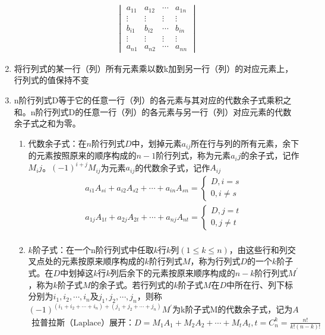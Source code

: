 \documentclass[12pt]{book}
\begin{document}
\begin{enumerate}[1.]
\begin{gather*}
\begin{vmatrix}
                  a_{11} & a_{12} & \cdots & a_{1n} \\
                  \vdots & \vdots & \vdots & \vdots \\
                  b_{i1} & b_{i2} & \cdots & b_{in} \\
                  \vdots & \vdots & \vdots & \vdots \\
                  a_{n1} & a_{n2} & \cdots & a_{nn}
              \end{vmatrix}
          \end{gather*}
    \item 将行列式的某一行（列）所有元素乘以数k加到另一行（列）的对应元素上，行列式的值保持不变
    \item n阶行列式D等于它的任意一行（列）的各元素与其对应的代数余子式乘积之和。n阶行列式D的任意一行（列）的各元素与另一行（列）对应元素的代数余子式之和为零。
    \begin{enumerate}[(1)]
        \item 代数余子式：在$n$阶行列式$D$中，划掉元素$a_{ij}$所在行与列的所有元素，余下的元素按照原来的顺序构成的$n-1$阶行列式，称为元素$a_ij$的余子式，记作$M_ij$。$(-1)^{i+j}M_{ij}$为元素$a_{ij}$的代数余子式，记作$A_{ij}$
        \begin{gather*}
            a_{i1}A_{si}+a_{i2}A_{s2}+\cdots+a_{in}A_{sn} = \begin{cases}
                D, i=s\\
                0, i\neq s
            \end{cases}\\
            a_{1j}A_{1t}+a_{2j}A_{2t}+\cdots+a_{nj}A_{nt} = \begin{cases}
                D, j=t\\
                0, j\neq t
            \end{cases}\\
        \end{gather*}
        \item $k$阶子式：在一个n阶行列式中任取$k$行$k$列$(1\leqslant k\leqslant n)$，由这些行和列交叉点处的元素按原来顺序构成的$k$阶行列式$M$，称为行列式$D$的一个$k$阶子式。在$D$中划掉这$k$行$k$列后余下的元素按原来顺序构成的$n-k$阶行列式$M^\prime$，称为$k$阶子式$M$的余子式。若行列式的$k$阶子式$M$在$D$中所在行、列下标分别为$i_1,i_2,\cdots,i_n$及$j_1,j_2,\cdots,j_n$，则称$(-1)^{(i_1+i_2+\cdots+i_n)+(j_1+j_2+\cdots+j_n)}M^\prime$为k阶子式M的代数余子式，记为$A$
        \begin{gather*}
            \text{拉普拉斯（Laplace）展开：}
            D=M_{1}A_{1}+M_{2}A_{2}+\cdots+M_{t}A_{t}, 
            t=C^k_n = \frac{n!}{k!(n-k)!} 
        \end{gather*}
    \end{enumerate}
\end{enumerate}
\end{document}
